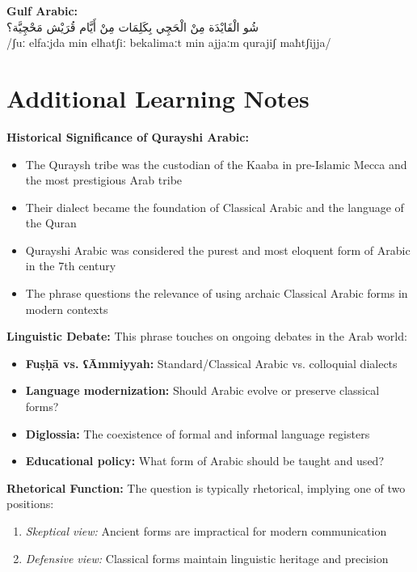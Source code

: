 \documentclass[letterpaper,12pt]{article}
\begin{document}
\textbf{Gulf Arabic:}\\
\textarabic{شُو الْفَايْدَة مِنْ الْحَچِي بِكَلِمَات مِنْ أَيَّام قُرَيْش مَحْچِيَّة؟}\\
/ʃuː elfaːjda min elħatʃiː bekalimaːt min ajjaːm qurajiʃ maħtʃijja/

\section{Additional Learning Notes}

\begin{tcolorbox}[colback=boxcolor,colframe=accentcolor,title=\textbf{Cultural and Linguistic Context},breakable]

\textbf{Historical Significance of Qurayshi Arabic:}
\begin{itemize}
\item The Quraysh tribe was the custodian of the Kaaba in pre-Islamic Mecca and the most prestigious Arab tribe
\item Their dialect became the foundation of Classical Arabic and the language of the Quran
\item Qurayshi Arabic was considered the purest and most eloquent form of Arabic in the 7th century
\item The phrase questions the relevance of using archaic Classical Arabic forms in modern contexts
\end{itemize}

\textbf{Linguistic Debate:}
This phrase touches on ongoing debates in the Arab world:
\begin{itemize}
\item \textbf{Fuṣḥā vs. ʕĀmmiyyah:} Standard/Classical Arabic vs. colloquial dialects
\item \textbf{Language modernization:} Should Arabic evolve or preserve classical forms?
\item \textbf{Diglossia:} The coexistence of formal and informal language registers
\item \textbf{Educational policy:} What form of Arabic should be taught and used?
\end{itemize}

\textbf{Rhetorical Function:}
The question is typically rhetorical, implying one of two positions:
\begin{enumerate}
\item \textit{Skeptical view:} Ancient forms are impractical for modern communication
\item \textit{Defensive view:} Classical forms maintain linguistic heritage and precision
\end{enumerate}


\end{tcolorbox}
\end{document}
